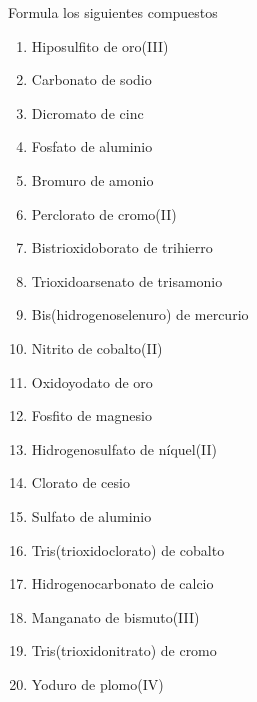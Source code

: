 \documentclass[10pt]{article}
\begin{document}
\begin{exercise}[
    tags    = {inorgánica,sales, sales ternarias, oxosales,2B},
    topics  = {química inorgánica,formulación,nomenclatura},
    source  = {Química 2B OXF 2016, p347, e12},
  ]

  Formula los siguientes compuestos

  \begin{enumerate}
    \item Hiposulfito de oro(III)
    \item Carbonato de sodio
    \item Dicromato de cinc
    \item Fosfato de aluminio
    \item Bromuro de amonio
    \item Perclorato de cromo(II)
    \item Bistrioxidoborato de trihierro
    \item Trioxidoarsenato de trisamonio
    \item Bis(hidrogenoselenuro) de mercurio
    \item Nitrito de cobalto(II)
    \item Oxidoyodato de oro
    \item Fosfito de magnesio
    \item Hidrogenosulfato de níquel(II)
    \item Clorato de cesio
    \item Sulfato de aluminio
    \item Tris(trioxidoclorato) de cobalto
    \item Hidrogenocarbonato de calcio
    \item Manganato de bismuto(III)
    \item Tris(trioxidonitrato) de cromo
    \item Yoduro de plomo(IV)
  \end{enumerate}
\end{exercise}
\end{document}
